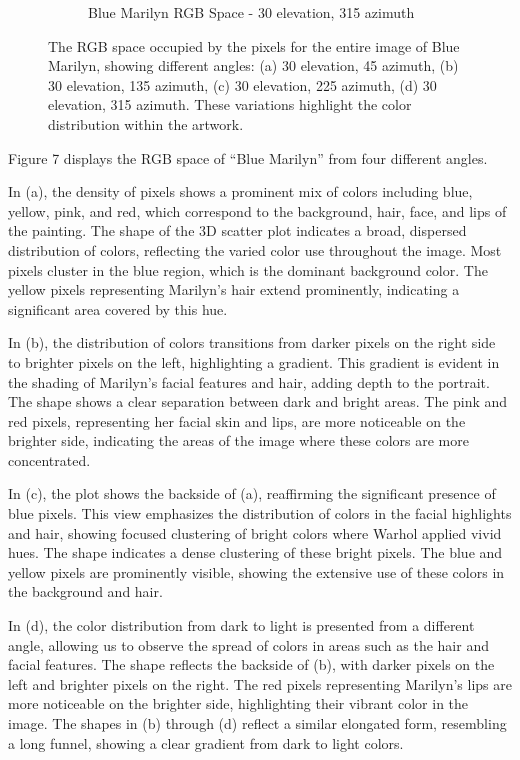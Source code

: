 \documentclass{article}
\begin{document}
\begin{figure}[ht]
\begin{subfigure}{0.45\textwidth}
    \caption{Blue Marilyn RGB Space - 30 \degree elevation, 315 \degree azimuth}
    \label{fig:4_16_blue_marilyn_original_scatter}
  \end{subfigure}
  \caption{The RGB space occupied by the pixels for the entire image of Blue Marilyn, showing different angles: (a) 30 \degree elevation, 45 \degree azimuth, (b) 30 \degree elevation, 135 \degree azimuth, (c) 30 \degree elevation, 225 \degree azimuth, (d) 30 \degree elevation, 315 \degree azimuth. These variations highlight the color distribution within the artwork.}
  \label{fig:blue_marilyn_original_scatter_2}
\end{figure}

Figure 7 displays the RGB space of ``Blue Marilyn'' from four different
angles.

In (a), the density of pixels shows a prominent mix of colors including
blue, yellow, pink, and red, which correspond to the background, hair,
face, and lips of the painting. The shape of the 3D scatter plot
indicates a broad, dispersed distribution of colors, reflecting the
varied color use throughout the image. Most pixels cluster in the blue
region, which is the dominant background color. The yellow pixels
representing Marilyn's hair extend prominently, indicating a significant
area covered by this hue.

In (b), the distribution of colors transitions from darker pixels on the
right side to brighter pixels on the left, highlighting a gradient. This
gradient is evident in the shading of Marilyn's facial features and
hair, adding depth to the portrait. The shape shows a clear separation
between dark and bright areas. The pink and red pixels, representing her
facial skin and lips, are more noticeable on the brighter side,
indicating the areas of the image where these colors are more
concentrated.

In (c), the plot shows the backside of (a), reaffirming the significant
presence of blue pixels. This view emphasizes the distribution of colors
in the facial highlights and hair, showing focused clustering of bright
colors where Warhol applied vivid hues. The shape indicates a dense
clustering of these bright pixels. The blue and yellow pixels are
prominently visible, showing the extensive use of these colors in the
background and hair.

In (d), the color distribution from dark to light is presented from a
different angle, allowing us to observe the spread of colors in areas
such as the hair and facial features. The shape reflects the backside of
(b), with darker pixels on the left and brighter pixels on the right.
The red pixels representing Marilyn's lips are more noticeable on the
brighter side, highlighting their vibrant color in the image. The shapes
in (b) through (d) reflect a similar elongated form, resembling a long
funnel, showing a clear gradient from dark to light colors.
\end{document}

